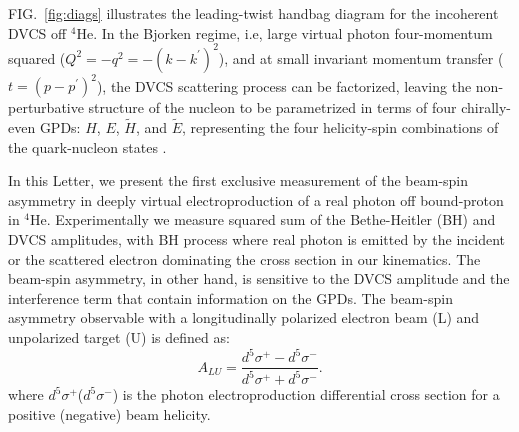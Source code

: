 \documentclass[twocolumn,nofootinbib,showpacs,prl,superscriptaddress,secnumarabic,amssymb,nobibnotes,aps,floatfix]{revtex4}
\begin{document}
FIG.~\ref{fig:diags} illustrates the 
leading-twist handbag diagram for the incoherent DVCS off $^{4}$He. In the 
Bjorken regime, i.e, large virtual photon four-momentum squared 
($Q^{2}=-q^2=-(k-k^\prime)^2$), and at small invariant momentum transfer ($t=(p-p^\prime)^2$), the 
DVCS scattering process can be factorized, leaving the non-perturbative structure 
of the nucleon to be parametrized in terms of four chirally-even GPDs: $H$, 
$E$, $\widetilde{H}$, and $\widetilde{E}$, representing the four helicity-spin 
combinations of the quark-nucleon states \cite{Freund_Collins,Ji_Osborne}.

In this Letter, we present the first exclusive measurement of the beam-spin asymmetry in deeply virtual electroproduction of a real photon off bound-proton in $^{4}$He. Experimentally we measure squared sum of the Bethe-Heitler (BH) and DVCS amplitudes, with BH process where real photon is emitted by the incident or the scattered electron dominating the cross section in our kinematics.   
The beam-spin asymmetry, in other hand, is sensitive to the DVCS amplitude and the interference term that contain information on the GPDs. 
The beam-spin asymmetry observable with a longitudinally polarized electron beam (L) and unpolarized target (U) is defined as:
\begin{equation}
  A_{LU} = \frac{d^{5}\sigma^{+} - d^{5}\sigma^{-} }
                {d^{5}\sigma^{+} + d^{5}\sigma^{-}}.
    \label{BSA_equation}
  \end{equation}
where $d^{5}\sigma^{+}$($d^{5}\sigma^{-}$) is the photon electroproduction 
differential cross section for a positive (negative) beam helicity. 
\end{document}

